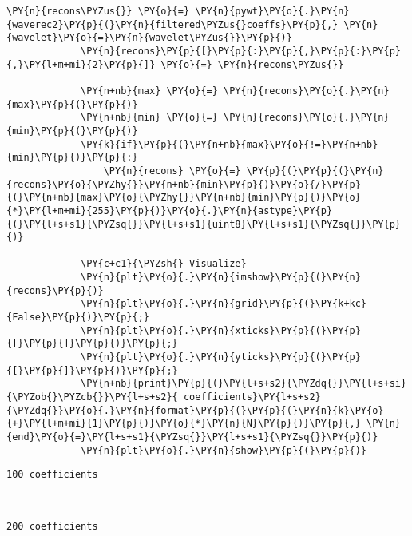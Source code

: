 \begin{Verbatim}[commandchars=\\\{\}]
             \PY{n}{recons\PYZus{}} \PY{o}{=} \PY{n}{pywt}\PY{o}{.}\PY{n}{waverec2}\PY{p}{(}\PY{n}{filtered\PYZus{}coeffs}\PY{p}{,} \PY{n}{wavelet}\PY{o}{=}\PY{n}{wavelet\PYZus{}}\PY{p}{)}
             \PY{n}{recons}\PY{p}{[}\PY{p}{:}\PY{p}{,}\PY{p}{:}\PY{p}{,}\PY{l+m+mi}{2}\PY{p}{]} \PY{o}{=} \PY{n}{recons\PYZus{}}
                               
             \PY{n+nb}{max} \PY{o}{=} \PY{n}{recons}\PY{o}{.}\PY{n}{max}\PY{p}{(}\PY{p}{)}
             \PY{n+nb}{min} \PY{o}{=} \PY{n}{recons}\PY{o}{.}\PY{n}{min}\PY{p}{(}\PY{p}{)}
             \PY{k}{if}\PY{p}{(}\PY{n+nb}{max}\PY{o}{!=}\PY{n+nb}{min}\PY{p}{)}\PY{p}{:}
                 \PY{n}{recons} \PY{o}{=} \PY{p}{(}\PY{p}{(}\PY{n}{recons}\PY{o}{\PYZhy{}}\PY{n+nb}{min}\PY{p}{)}\PY{o}{/}\PY{p}{(}\PY{n+nb}{max}\PY{o}{\PYZhy{}}\PY{n+nb}{min}\PY{p}{)}\PY{o}{*}\PY{l+m+mi}{255}\PY{p}{)}\PY{o}{.}\PY{n}{astype}\PY{p}{(}\PY{l+s+s1}{\PYZsq{}}\PY{l+s+s1}{uint8}\PY{l+s+s1}{\PYZsq{}}\PY{p}{)}
         
             \PY{c+c1}{\PYZsh{} Visualize}
             \PY{n}{plt}\PY{o}{.}\PY{n}{imshow}\PY{p}{(}\PY{n}{recons}\PY{p}{)}
             \PY{n}{plt}\PY{o}{.}\PY{n}{grid}\PY{p}{(}\PY{k+kc}{False}\PY{p}{)}\PY{p}{;}
             \PY{n}{plt}\PY{o}{.}\PY{n}{xticks}\PY{p}{(}\PY{p}{[}\PY{p}{]}\PY{p}{)}\PY{p}{;}
             \PY{n}{plt}\PY{o}{.}\PY{n}{yticks}\PY{p}{(}\PY{p}{[}\PY{p}{]}\PY{p}{)}\PY{p}{;}
             \PY{n+nb}{print}\PY{p}{(}\PY{l+s+s2}{\PYZdq{}}\PY{l+s+si}{\PYZob{}\PYZcb{}}\PY{l+s+s2}{ coefficients}\PY{l+s+s2}{\PYZdq{}}\PY{o}{.}\PY{n}{format}\PY{p}{(}\PY{p}{(}\PY{n}{k}\PY{o}{+}\PY{l+m+mi}{1}\PY{p}{)}\PY{o}{*}\PY{n}{N}\PY{p}{)}\PY{p}{,} \PY{n}{end}\PY{o}{=}\PY{l+s+s1}{\PYZsq{}}\PY{l+s+s1}{\PYZsq{}}\PY{p}{)}
             \PY{n}{plt}\PY{o}{.}\PY{n}{show}\PY{p}{(}\PY{p}{)}
\end{Verbatim}


    \begin{Verbatim}[commandchars=\\\{\}]
100 coefficients
    \end{Verbatim}

    \begin{center}
    \end{center}
    { \hspace*{\fill} \\}
    
    \begin{Verbatim}[commandchars=\\\{\}]
200 coefficients
    \end{Verbatim}

